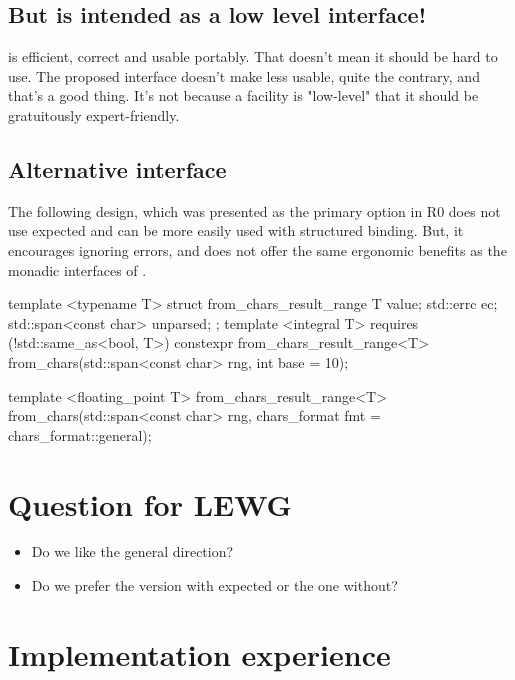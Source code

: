 \documentclass{wg21}
\begin{document}
\subsection{But  is intended as a low level interface!}

 is efficient, correct and usable portably. That doesn't mean it should be hard to use.
The proposed interface doesn't make  less usable, quite the contrary, and that's a good thing.
It's not because a facility is "low-level" that it should be gratuitously expert-friendly.


\subsection{Alternative interface}

The following design, which was presented as the primary option in R0 does not use expected and can be more easily used
with structured binding. But, it encourages ignoring errors, and does not offer the same ergonomic benefits as the monadic interfaces
of .

\begin{colorblock}
template <typename T>
struct from_chars_result_range {
    T value;
    std::errc ec;
    std::span<const char> unparsed;
};
template <integral T>
requires (!std::same_as<bool, T>)
constexpr from_chars_result_range<T> from_chars(std::span<const char> rng, int base = 10);

template <floating_point T>
from_chars_result_range<T> from_chars(std::span<const char> rng, chars_format fmt = chars_format::general);
\end{colorblock}



\section{Question for LEWG}

\begin{itemize}
    \item Do we like the general direction?
    \item Do we prefer the version with expected or the one without?
\end{itemize}

\section{Implementation experience}
\end{document}
